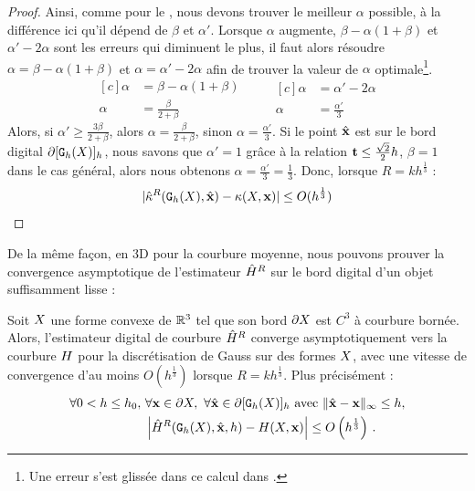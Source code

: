 \begin{proof}
%
Ainsi, comme pour le , nous devons trouver
le meilleur $\alpha$ possible, à la différence ici qu'il dépend de $\beta$ et
$\alpha'$.
%
Lorsque $\alpha$ augmente, $\beta-\alpha(1+\beta)$ et $\alpha'-2\alpha$ sont les
erreurs qui diminuent le plus, il faut alors résoudre $\alpha =
\beta-\alpha(1+\beta)$ et $\alpha = \alpha'-2\alpha$ afin de trouver la valeur
de $\alpha$ optimale\footnote{Une erreur s'est glissée dans ce calcul dans
\cite{DGCI2013}.}.
%
\begin{equation}
\begin{aligned}[c]
  \alpha &= \beta-\alpha(1+\beta)\\
  \alpha &= \frac{\beta}{2+\beta}
\end{aligned}
\qquad
\begin{aligned}[c]
  \alpha &= \alpha' - 2\alpha\\
  \alpha &= \frac{\alpha'}{3}
\end{aligned}
\end{equation}
%
Alors, si $\alpha' \ge \frac{3 \beta}{2 + \beta}$, alors $\alpha = \frac{\beta}{2 +
\beta}$, sinon $\alpha = \frac{\alpha'}{3}$.
%
Si le point $\hat{\mathbf{x}}$ est sur le bord digital $\partial \lbrack \mathtt{G}_{h}(X) \rbrack_{h}$, nous savons
que $\alpha'=1$ grâce à la relation $\mathbf{t} \le \frac{\sqrt{2}}{2}h$, $\beta = 1$
dans le cas général, alors nous obtenons $\alpha = \frac{\alpha'}{3} =
\frac{1}{3}$. Donc, lorsque $R = kh^{\frac{1}{3}}$ :
%
\begin{equation}
  | \hat{\kappa}^{R}(\mathtt{G}_{h}(X),\hat{\mathbf{x}}) - \kappa(X,\mathbf{x}) | \le O(h^{\frac{1}{3}})
\end{equation}
%
\end{proof}
%
De la même façon, en 3D pour la courbure moyenne, nous pouvons prouver la
convergence asymptotique de l'estimateur $\hat{H}^{R}$ sur le bord digital
d'un objet suffisamment lisse :
%
\begin{theorem} \label{thm:multigrid-convergence-curv-mean}
%
Soit $X$ une forme convexe de $\mathbb{R}^3$ tel que son bord $\partial X$ est $C^3$ à
courbure bornée. Alors, l'estimateur digital de courbure $\hat{H}^{R}$ converge
asymptotiquement vers la courbure $H$ pour la discrétisation de Gauss sur
des formes $X$, avec une vitesse de convergence d'au moins
$O(h^\frac{1}{3})$ lorsque $R = kh^\frac{1}{3}$. Plus précisément :
%
\begin{align}
  \forall 0 < h \le h_0,\,\, & \forall \mathbf{x} \in \partial X,\,\,
  \forall \hat{\mathbf{x}} \in \partial \lbrack \mathtt{G}_{h}(X) \rbrack_{h} \text{~avec~} \| \hat{\mathbf{x}} -\mathbf{x}\|_\infty \le h, \nonumber \\
  & \left| \hat{H}^{R}(\mathtt{G}_{h}(X), \hat{\mathbf{x}}, h) - H(X, \mathbf{x}) \right| \le O\left(h^{\frac{1}{3}}\right)\,.
\end{align}
%
\end{theorem}
